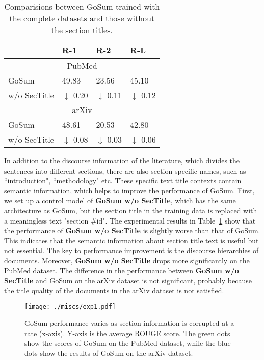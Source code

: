 \documentclass[11pt,a4paper]{article}
\begin{document}
\begin{table}[t]
  \centering
  \begin{tabular}{l|p{13mm}p{13mm}p{13mm}}\toprule
                    & \hfil R-1  & \hfil R-2  & \hfil R-L    \\ \midrule
                    \multicolumn{4}{c}{PubMed}     \\ \midrule
        GoSum                       & \hfil 49.83 & \hfil 23.56 & \hfil 45.10   \\
        \quad w/o SecTitle           & \hfil $\downarrow$ 0.20 & \hfil $\downarrow$ 0.11 & \hfil $\downarrow$ 0.12   \\ \midrule
                    \multicolumn{4}{c}{arXiv}     \\ \midrule
        GoSum                       & \hfil 48.61 & \hfil 20.53 & \hfil 42.80   \\
        \quad w/o SecTitle           & \hfil $\downarrow$ 0.08 & \hfil $\downarrow$ 0.03 & \hfil $\downarrow$ 0.06   \\ \bottomrule
  \end{tabular}
   \caption{Comparisions between GoSum trained with the complete datasets and those without the section titles.} \label{tab:exp2}
\end{table} 
In addition to the discourse information of the literature, which divides the sentences into different sections, there are also section-specific names, such as ``introduction", ``methodology" etc.
These specific text title contexts contain semantic information, which helps to improve the performance of GoSum.
First, we set up a control model of \textbf{GoSum w/o SecTitle}, which has the same architecture as GoSum, but the section title in the training data is replaced with a meaningless text "section \#id".
The experimental results in Table~\ref{tab:exp2} show that the performance of  \textbf{GoSum w/o SecTitle} is slightly worse than that of GoSum. This indicates that the semantic information about section title text is useful but not essential. The key to performance improvement is the discourse hierarchies of documents.
Moreover, \textbf{GoSum w/o SecTitle} drops more significantly on the PubMed dataset. The difference in the performance between \textbf{GoSum w/o SecTitle}  and GoSum on the arXiv dataset is not significant, probably because the title quality of the documents in the arXiv dataset is not satisfied.

\begin{figure}[t]
    \centering
    \texttt{[image: ./miscs/exp1.pdf]} \caption{GoSum performance varies as section information is corrupted at a rate (x-axis). Y-axis is the average ROUGE score. The green dots show the scores of GoSum on the PubMed dataset, while the blue dots show the results of GoSum on the arXiv dataset.}
    \label{fig:exp1}
\end{figure}
 
\end{document}
